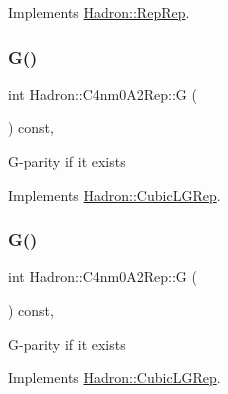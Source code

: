 Implements \mbox{\hyperlink{structHadron_1_1RepRep_a92c8802e5ed7afd7da43ccfd5b7cd92b}{Hadron\+::\+Rep\+Rep}}.

\mbox{\label{structHadron_1_1C4nm0A2Rep_adefa492c65021016023f200b4c397770}} 
\subsubsection{\texorpdfstring{G()}{G()}\hspace{0.1cm}{\footnotesize\ttfamily [1/3]}}
{\footnotesize\ttfamily int Hadron\+::\+C4nm0\+A2\+Rep\+::G (\begin{DoxyParamCaption}{ }\end{DoxyParamCaption}) const\hspace{0.3cm}{\ttfamily [inline]}, {\ttfamily [virtual]}}

G-\/parity if it exists 

Implements \mbox{\hyperlink{structHadron_1_1CubicLGRep_ace26f7b2d55e3a668a14cb9026da5231}{Hadron\+::\+Cubic\+L\+G\+Rep}}.

\mbox{\label{structHadron_1_1C4nm0A2Rep_adefa492c65021016023f200b4c397770}} 
\subsubsection{\texorpdfstring{G()}{G()}\hspace{0.1cm}{\footnotesize\ttfamily [2/3]}}
{\footnotesize\ttfamily int Hadron\+::\+C4nm0\+A2\+Rep\+::G (\begin{DoxyParamCaption}{ }\end{DoxyParamCaption}) const\hspace{0.3cm}{\ttfamily [inline]}, {\ttfamily [virtual]}}

G-\/parity if it exists 

Implements \mbox{\hyperlink{structHadron_1_1CubicLGRep_ace26f7b2d55e3a668a14cb9026da5231}{Hadron\+::\+Cubic\+L\+G\+Rep}}.

\mbox{\label{structHadron_1_1C4nm0A2Rep_adefa492c65021016023f200b4c397770}} 
